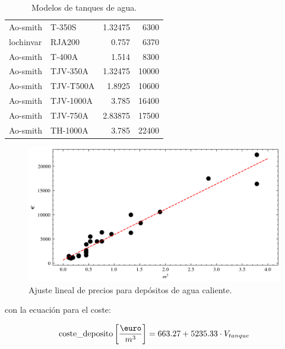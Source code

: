 \begin{table}[htbp]
\begin{tabular}{llrr}
		Ao-smith       & T-350S    & 1.32475         & 6300           \\
		lochinvar      & RJA200    & 0.757           & 6370           \\
		Ao-smith       & T-400A    & 1.514           & 8300           \\
		Ao-smith       & TJV-350A  & 1.32475         & 10000          \\
		Ao-smith       & TJV-T500A & 1.8925          & 10600          \\
		Ao-smith       & TJV-1000A & 3.785           & 16400          \\
		Ao-smith       & TJV-750A  & 2.83875         & 17500          \\
		Ao-smith       & TH-1000A  & 3.785           & 22400          \\
		\bottomrule
	\end{tabular}
	\caption{Modelos de tanques de agua.}
	\label{tab:tank_data}
\end{table}


\begin{figure}[h] \centering
	\centering
	\includegraphics[width=1\textwidth]{./capitulos/adquisicion_de_datos/images/tank_regression.png}
	\caption{Ajuste lineal de precios para depósitos de agua caliente.}
	\label{fig:tank_regression}
\end{figure}

con la ecuación para el coste:

\begin{equation}
	\text{coste\_deposito} \left[\frac{\text{\euro}}{m^3}\right] = 663.27 + 5235.33 \cdot V_{tanque}
\end{equation}
